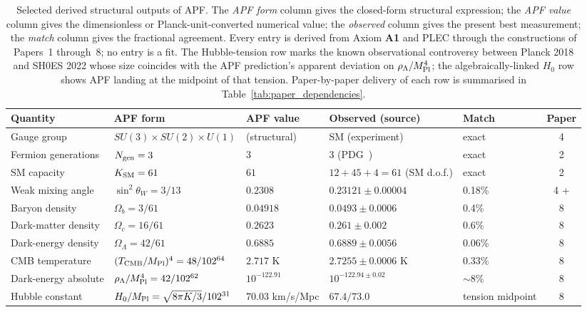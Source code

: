 \documentclass[11pt]{article}
\newcommand{\Aone}{\textbf{A1}}
\newcommand{\Mpl}{M_{\rm Pl}}
\begin{document}
\begin{table}[h]
\centering
\footnotesize
\setlength{\tabcolsep}{4pt}
\begin{tabularx}{\textwidth}{@{}l l l X l c@{}}
\toprule
\textbf{Quantity} & \textbf{APF form} & \textbf{APF value} & \textbf{Observed (source)} & \textbf{Match} & \textbf{Paper} \\
\midrule
Gauge group                      & $SU(3)\!\times\!SU(2)\!\times\!U(1)$ & (structural) & SM (experiment)                                         & exact & 4 \\
Fermion generations              & $N_{\rm gen} = 3$                   & $3$          & $3$ (PDG~\cite{PDG2024})                                & exact & 2 \\
SM capacity                      & $K_{\rm SM} = 61$                   & $61$         & $12 + 45 + 4 = 61$ (SM d.o.f.)                           & exact & 2 \\
Weak mixing angle                & $\sin^2\theta_W = 3/13$             & $0.2308$     & $0.23121 \pm 0.00004$~\cite{PDG2024}                    & 0.18\% & 4 + \cite{BrookeWeakMixing} \\
\addlinespace[2pt]
Baryon density                   & $\Omega_b = 3/61$                   & $0.04918$    & $0.0493 \pm 0.0006$~\cite{Planck2018}                    & 0.4\%  & 8 \\
Dark-matter density              & $\Omega_c = 16/61$                  & $0.2623$     & $0.261 \pm 0.002$~\cite{Planck2018}                      & 0.6\%  & 8 \\
Dark-energy density              & $\Omega_\Lambda = 42/61$            & $0.6885$     & $0.6889 \pm 0.0056$~\cite{Planck2018}                    & 0.06\% & 8 \\
\addlinespace[2pt]
CMB temperature                  & $(T_{\rm CMB}/\Mpl)^4 = 48/102^{64}$ & $2.717$ K   & $2.7255 \pm 0.0006$ K~\cite{Fixsen2009}                  & 0.33\% & 8 \\
Dark-energy absolute             & $\rho_\Lambda/\Mpl^4 = 42/102^{62}$ & $10^{-122.91}$ & $10^{-122.94 \pm 0.02}$~\cite{Planck2018,Riess2022}   & $\sim$8\% & 8 \\
Hubble constant                  & $H_0/\Mpl = \sqrt{8\pi K/3}/102^{31}$ & $70.03$ km/s/Mpc & $67.4 / 73.0$~\cite{Planck2018,Riess2022}             & tension midpoint & 8 \\
\bottomrule
\end{tabularx}
\caption{Selected derived structural outputs of APF.  The \emph{APF form} column gives the closed-form structural expression; the \emph{APF value} column gives the dimensionless or Planck-unit-converted numerical value; the \emph{observed} column gives the present best measurement; the \emph{match} column gives the fractional agreement.  Every entry is derived from Axiom \Aone{} and PLEC through the constructions of Papers~1 through~8; no entry is a fit.  The Hubble-tension row marks the known observational controversy between Planck 2018 and SH0ES 2022 whose size coincides with the APF prediction's apparent deviation on $\rho_\Lambda/\Mpl^4$; the algebraically-linked $H_0$ row shows APF landing at the midpoint of that tension.  Paper-by-paper delivery of each row is summarised in Table~\ref{tab:paper_dependencies}.}\label{tab:taster}

\end{table}
\end{document}
